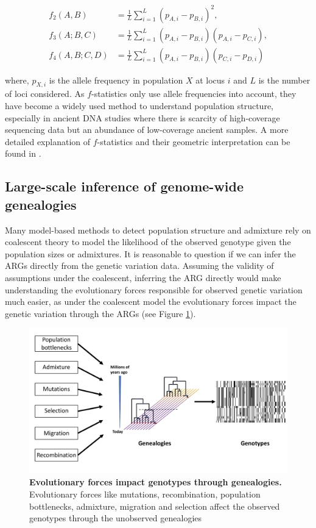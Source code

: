 \begin{equation}
\begin{aligned}
    f_2(A, B) &= \frac{1}{L} \sum_{i=1}^{L} (p_{A,i} - p_{B,i})^2, \\
    f_3(A; B, C) &= \frac{1}{L} \sum_{i=1}^{L} (p_{A,i} - p_{B,i})(p_{A,i} - p_{C,i}), \\
    f_4(A, B; C, D) &= \frac{1}{L} \sum_{i=1}^{L} (p_{A,i} - p_{B,i})(p_{C,i} - p_{D,i})
\end{aligned}
\end{equation}

where, \( p_{X,i} \) is the allele frequency in population \( X \) at locus \( i \) and \( L \) is the number of loci considered. As \( f \)-statistics only use allele frequencies into account, they have become a widely used method to understand population structure, especially in ancient DNA studies where there is scarcity of high-coverage sequencing data but an abundance of low-coverage ancient samples. A more detailed explanation of \( f \)-statistics and their geometric interpretation can be found in \cite{peter2022geometric}.

\subsection{Large-scale inference of genome-wide genealogies}
Many model-based methods to detect population structure and admixture rely on coalescent theory to model the likelihood of the observed genotype given the population sizes or admixtures. It is reasonable to question if we can infer the ARGs directly from the genetic variation data. Assuming the validity of assumptions under the coalescent, inferring the ARG directly would make understanding the evolutionary forces responsible for observed genetic variation much easier, as under the coalescent model the evolutionary forces impact the genetic variation through the ARGs (see Figure \ref{fig:ghostbuster_intro}).

\begin{figure}[h!]
    \centering
    \includegraphics[width=\linewidth]{figures/thesis_ghostbuster_intro.pdf}
    \caption{\textbf{Evolutionary forces impact genotypes through genealogies.} Evolutionary forces like mutations, recombination, population bottlenecks, admixture, migration and selection affect the observed genotypes through the unobserved genealogies}
    \label{fig:ghostbuster_intro}
\end{figure}

